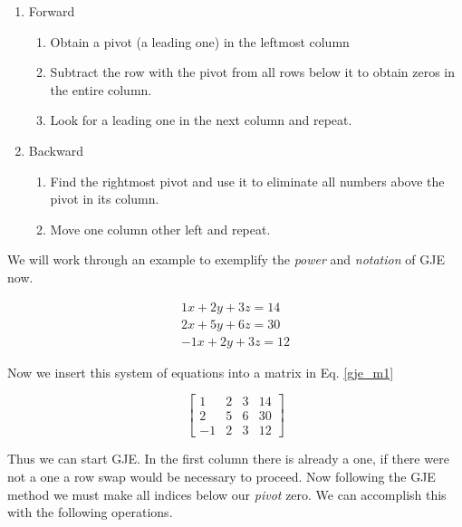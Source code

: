 \documentclass[12pt]{article}
\begin{document}
					\begin{enumerate}
					\item Forward
						\begin{enumerate}
						\item Obtain a pivot (a leading one) in the leftmost column
						\item Subtract the row with the pivot from all rows below it to obtain zeros in the entire column.
						\item Look for a leading one in the next column and repeat.
						\end{enumerate}
					\item Backward
						\begin{enumerate}
						\item Find the rightmost pivot and use it to eliminate all numbers above the pivot in its column.
						\item Move one column other left and repeat.
						\end{enumerate}
					\end{enumerate}

					We will work through an example to exemplify the \textit{power} and \textit{notation} of GJE now.

					\begin{equation}
						\begin{split}
							1x  + 2y + 3z = 14 \\
							2x  + 5y + 6z = 30 \\
							-1x + 2y + 3z = 12
						\end{split}
					\end{equation}

					Now we insert this system of equations into a matrix in Eq. \eqref{gje_m1}

					\begin{equation} \label{gje_m1}
						\left[
						\begin{array}{ccc|c}
							1  & 2 & 3 & 14 \\
							2  & 5 & 6 & 30 \\
							-1 & 2 & 3 & 12
						\end{array}
					\right]
					\end{equation}

					Thus we can start GJE.
					In the first column there is already a one,
						if there were not a one a row swap would be necessary to proceed.
					Now following the GJE method we must make all indices below our \textit{pivot} zero.
					We can accomplish this with the following operations.
\end{document}
